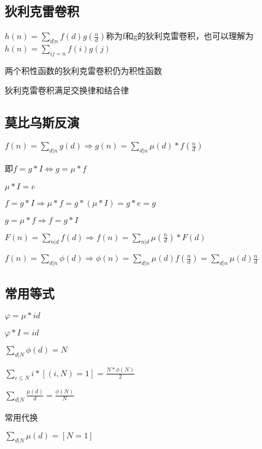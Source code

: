 \documentclass[UTF8]{ctexart}
\begin{document}
\subsection{狄利克雷卷积}

$h(n)=\sum_{d|n}f(d)g(\frac{n}{d})$称为f和g的狄利克雷卷积，也可以理解为$h(n)=\sum_{ij=n}f(i)g(j)$\par

两个积性函数的狄利克雷卷积仍为积性函数\par

狄利克雷卷积满足交换律和结合律\par

\subsection{莫比乌斯反演}

$f(n)=\sum_{d|n}g(d)\Rightarrow g(n)=\sum_{d|n}\mu(d)*f(\frac{n}{d})$\par
即$f=g*I \Leftrightarrow g=\mu*f$\par
$\mu*I=e$\par
$f=g*I \Rightarrow \mu*f = g*(\mu*I)=g*e=g$\par
$g=\mu*f \Rightarrow f=g*I$\par

$F(n)=\sum_{n|d}f(d)\Rightarrow f(n)=\sum_{n|d}\mu(\frac{n}{d})*F(d)$\par

$f(n)=\sum_{d|n}\phi(d)\Rightarrow \phi(n)=\sum_{d|n}\mu(d)f(\frac{n}{d})=\sum_{d|n}\mu(d)\frac{n}{d}$\par

\subsection{常用等式}

$\varphi = \mu * id$\par

$\varphi * I = id$\par

$\sum_{d|N}\phi(d)=N$\par

$\sum_{i\leq N}i*[(i,N)=1]=\frac{N*\phi(N)}{2}$\par

$\sum_{d|N}\frac{\mu(d)}{d}=\frac{\phi(N)}{N}$\par

常用代换\par

$\sum_{d|N}\mu(d)=[N=1]$\par
\end{document}
